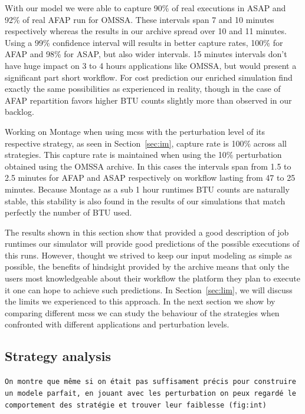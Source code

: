 \documentclass[10pt,conference,compsocconf]{IEEEtran}
\begin{document}
With our model we were able to capture 90\% of real executions in ASAP and
92\% of real AFAP run for OMSSA\@. These intervals span 7 and 10 minutes
respectively whereas the results in our archive spread over 10 and 11 minutes.
Using a 99\% confidence interval will results in better capture rates, 100\% for
AFAP and 98\% for ASAP, but also wider intervals. 15 minutes intervals don't
have huge impact on 3 to 4 hours applications like OMSSA, but would present a
significant part short workflow. For cost prediction our enriched simulation
find exactly the same possibilities as experienced in reality, though in the
case of AFAP repartition favors higher BTU counts slightly more than observed in
our backlog.

Working on Montage when using \acp{mcs} with the perturbation level of its
respective strategy, as seen in Section~\ref{sec:im}, capture rate is 100\%
across all strategies. This capture rate is maintained when using the 10\%
perturbation obtained using the OMSSA archive. In this cases the intervals span
from 1.5 to 2.5 minutes for AFAP and ASAP respectively on workflow lasting from
47 to 25 minutes. Because Montage as a sub 1 hour runtimes BTU counts are
naturally stable, this stability is also found in the results of our simulations
that match perfectly the number of BTU used.

The results shown in this section show that provided a good description of job
runtimes our simulator will provide good predictions of the possible executions
of this runs. However, thought we strived to keep our input modeling as simple
as possible, the benefits of hindsight provided by the archive means that only
the users most knowledgeable about their workflow the platform they plan to
execute it one can hope to achieve such predictions. In Section~\ref{sec:lim},
we will discuss the limits we experienced to this approach. In the next section
we show by comparing different \acp{mcs} we can study the behaviour of the
strategies when confronted with different applications and perturbation levels.


\subsection{Strategy analysis}

\texttt{On montre que même si on était pas suffisament précis pour construire un
modele parfait, en jouant avec les perturbation on peux regardé le comportement
des stratégie et trouver leur faiblesse (fig:int)}
\end{document}
